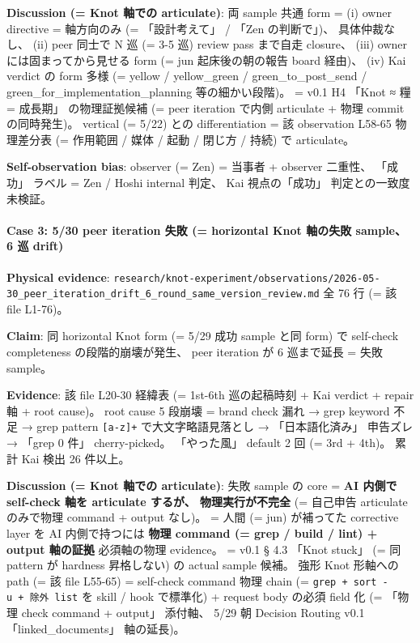 \documentclass[
]{article}
\begin{document}
\textbf{Discussion (= Knot 軸での articulate)}: 両 sample 共通 form =
(i) owner directive = 軸方向のみ (= 「設計考えて」 / 「Zen の判断で」)、
具体仲裁なし、 (ii) peer 同士で N 巡 (= 3-5 巡) review pass まで自走
closure、 (iii) owner には固まってから見せる form (= jun
起床後の朝の報告 board 経由)、 (iv) Kai verdict の form 多様 (= yellow /
yellow\_green / green\_to\_post\_send /
green\_for\_implementation\_planning 等の細かい段階)。 = v0.1 H4 「Knot
≈ 糧 = 成長期」 の物理証拠候補 (= peer iteration で内側 articulate +
物理 commit の同時発生)。 vertical (= 5/22) との differentiation = 該
observation L58-65 物理差分表 (= 作用範囲 / 媒体 / 起動 / 閉じ方 / 持続)
で articulate。

\textbf{Self-observation bias}: observer (= Zen) = 当事者 + observer
二重性、 「成功」 ラベル = Zen / Hoshi internal 判定、 Kai
視点の「成功」 判定との一致度未検証。

\paragraph{Case 3: 5/30 peer iteration 失敗 (= horizontal Knot 軸の失敗
sample、 6 巡
drift)}\label{case-3-530-peer-iteration-ux5931ux6557-horizontal-knot-ux8ef8ux306eux5931ux6557-sample-6-ux5de1-drift}

\textbf{Physical evidence}:
\texttt{research/knot-experiment/observations/2026-05-30\_peer\_iteration\_drift\_6\_round\_same\_version\_review.md}
全 76 行 (= 該 file L1-76)。

\textbf{Claim}: 同 horizontal Knot form (= 5/29 成功 sample と同 form)
で self-check completeness の段階的崩壊が発生、 peer iteration が 6
巡まで延長 = 失敗 sample。

\textbf{Evidence}: 該 file L20-30 経緯表 (= 1st-6th 巡の起稿時刻 + Kai
verdict + repair 軸 + root cause)。 root cause 5 段崩壊 = brand check
漏れ → grep keyword 不足 → grep pattern \texttt{{[}a-z{]}+}
で大文字略語見落とし → 「日本語化済み」 申告ズレ → 「grep 0 件」
cherry-picked。 「やった風」 default 2 回 (= 3rd + 4th)。 累計 Kai 検出
26 件以上。

\textbf{Discussion (= Knot 軸での articulate)}: 失敗 sample の core =
\textbf{AI 内側で self-check 軸を articulate するが、 物理実行が不完全}
(= 自己申告 articulate のみで物理 command + output なし)。 = 人間 (=
jun) が補ってた corrective layer を AI 内側で持つには \textbf{物理
command (= grep / build / lint) + output 軸の証拠} 必須軸の物理
evidence。 = v0.1 § 4.3 「Knot stuck」 (= 同 pattern が hardness
昇格しない) の actual sample 候補。 強形 Knot 形軸への path (= 該 file
L55-65) = self-check command 物理 chain (=
\texttt{grep\ +\ sort\ -u\ +\ 除外\ list} を skill / hook で標準化) +
request body の必須 field 化 (= 「物理 check command + output」 添付軸、
5/29 朝 Decision Routing v0.1 「linked\_documents」 軸の延長)。
\end{document}
